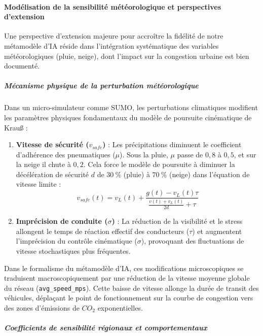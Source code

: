 \documentclass[10pt, a4paper]{article}
\providecommand{\tightlist}{}
\begin{document}
\paragraph{Modélisation de la sensibilité météorologique et perspectives
d'extension}\label{moduxe9lisation-de-la-sensibilituxe9-muxe9tuxe9orologique-et-perspectives-dextension}

Une perspective d'extension majeure pour accroître la fidélité de notre
métamodèle d'IA réside dans l'intégration systématique des variables
météorologiques (pluie, neige), dont l'impact sur la congestion urbaine
est bien documenté.

\subparagraph{Mécanisme physique de la perturbation
météorologique}\label{muxe9canisme-physique-de-la-perturbation-muxe9tuxe9orologique}

Dans un micro-simulateur comme SUMO, les perturbations climatiques
modifient les paramètres physiques fondamentaux du modèle de poursuite
cinématique de Krauß :

\begin{enumerate}
\def\labelenumi{\arabic{enumi}.}
\tightlist
\item
  \textbf{Vitesse de sécurité (\(v_{safe}\))} : Les précipitations
  diminuent le coefficient d'adhérence des pneumatiques (\(\mu\)). Sous
  la pluie, \(\mu\) passe de \(0,8\) à \(0,5\), et sur la neige il chute
  à \(0,2\). Cela force le modèle de poursuite à diminuer la
  décélération de sécurité \(d\) de \(30\ \%\) (pluie) à \(70\ \%\)
  (neige) dans l'équation de vitesse limite :
  \[v_{safe}(t) = v_L(t) + \frac{g(t) - v_L(t)\tau}{\frac{v(t) + v_L(t)}{2d} + \tau}\]
\item
  \textbf{Imprécision de conduite (\(\sigma\))} : La réduction de la
  visibilité et le stress allongent le temps de réaction effectif des
  conducteurs (\(\tau\)) et augmentent l'imprécision du contrôle
  cinématique (\(\sigma\)), provoquant des fluctuations de vitesse
  stochastiques plus fréquentes.
\end{enumerate}

Dans le formalisme du métamodèle d'IA, ces modifications microscopiques
se traduisent macroscopiquement par une réduction de la vitesse moyenne
globale du réseau (\texttt{avg\_speed\_mps}). Cette baisse de vitesse
allonge la durée de transit des véhicules, déplaçant le point de
fonctionnement sur la courbe de congestion vers des zones d'émissions de
\(CO_2\) exponentielles.

\subparagraph{Coefficients de sensibilité régionaux et
comportementaux}\label{coefficients-de-sensibilituxe9-ruxe9gionaux-et-comportementaux}
\end{document}
